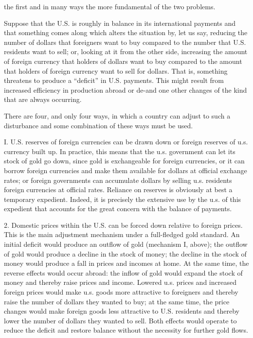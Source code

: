 \documentclass[11pt,openany]{book}
\begin{document}
the first and in many ways the more fundamental of the two problems.

Suppose that the U.S. is roughly in balance in its international payments and that something comes along which alters the situation by, let us say, reducing the number of dollars that foreigners want to buy compared to the number that U.S. residents want to sell; or, looking at it from the other side, increasing the amount of foreign currency that holders of dollars want to buy compared to the amount that holders of foreign currency want to sell for dollars. That is, something threatens to produce a ``deficit'' in U.S. payments. This might result from increased efficiency in production abroad or de-and one other changes of the kind that are always occurring.

There are four, and only four ways, in which a country can adjust to such a disturbance and some combination of these ways must be used.

I. U.S. reserves of foreign currencies can be drawn down or foreign reserves of u.s. currency built up. In practice, this means that the u.s. government can let its stock of gold go down, since gold is exchangeable for foreign currencies, or it can borrow foreign currencies and make them available for dollars at official exchange rates; or foreign governments can accumulate dollars by selling u.s. residents foreign currencies at official rates. Reliance on reserves is obviously at best a temporary expedient. Indeed, it is precisely the extensive use by the u.s. of this expedient that accounts for the great concern with the balance of payments.

2. Domestic prices within the U.S. can be forced down relative to foreign prices. This is the main adjustment mechanism under a full-fledged gold standard. An initial deficit would produce an outflow of gold (mechanism I, above); the outflow of gold would produce a decline in the stock of money; the decline in the stock of money would produce a fall in prices and incomes at home. At the same time, the reverse effects would occur abroad: the inflow of gold would expand the stock of money and thereby raise prices and income. Lowered u.s. prices and increased foreign prices would make u.s. goods more attractive to foreigners and thereby raise the number of dollars they wanted to buy; at the same time, the price changes would make foreign goods less attractive to U.S. residents and thereby lower the number of dollars they wanted to sell. Both effects would operate to reduce the deficit and restore balance without the necessity for further gold flows.
\end{document}

